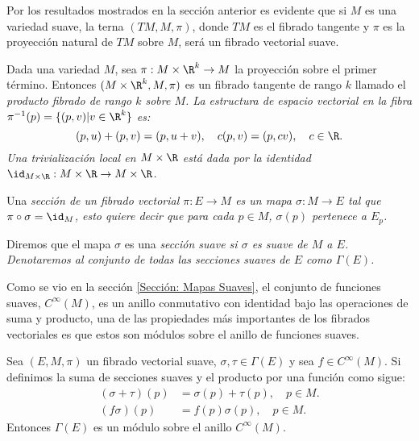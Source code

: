 \begin{example}
	Por los resultados mostrados en la sección anterior es evidente que si $M$ es una variedad suave, la terna $(TM, M, \pi)$, donde $TM$ es el fibrado tangente y $\pi$ es la proyección natural de $TM$ sobre $M$, será un fibrado vectorial suave.
\end{example}

\begin{example}
	Dada una variedad $M$, sea $\pi: M \times \R^{k} \to M$ la proyección sobre el primer término. Entonces $(M \times \R^{k}, M, \pi)$ es un fibrado tangente de rango $k$ llamado el \it{producto fibrado} de rango $k$ sobre $M$. La estructura de espacio vectorial en la fibra $\pi^{-1}(p) = \{(p,v) | v \in \R^{k}\}$ es:
	\[
		(p,u) + (p,v) = (p, u+v), \quad c(p,v) = (p,cv), \quad c \in \R.
	\]
  Una trivialización local en $M \times \R$ está dada por la identidad $\id_{M \times \R}: M \times \R \to  M \times \R$.
\end{example}

\begin{definition}
	Una \it{sección} de un fibrado vectorial $\pi: E \to M$ es un mapa $\sigma: M \to E$ tal que $\pi \circ \sigma = \id_{M}$, esto quiere decir que para cada $p \in M$, $\sigma(p)$ pertenece a $E_p$.

	Diremos que el mapa $\sigma$ es una \it{sección suave} si $\sigma$ es suave de $M$ a $E$. Denotaremos al conjunto de todas las secciones suaves de $E$ como $\Gamma(E)$.
\end{definition}

Como se vio en la sección \ref{Sección: Mapas Suaves}, el conjunto de funciones suaves, $C^{\infty}(M)$, es un anillo conmutativo con identidad bajo las operaciones de suma y producto, una de las propiedades más importantes de los fibrados vectoriales es que estos son módulos sobre el anillo de funciones suaves.

\begin{theorem}\label{Teorema: Los Fibrados Vectoriales Son Modulos}
	Sea $(E,M, \pi)$ un fibrado vectorial suave, $\sigma, \tau \in \Gamma(E)$ y sea $f \in C^{\infty}(M)$. Si definimos la suma de secciones suaves y el producto por una función como sigue:
	\begin{align*}
		(\sigma + \tau)(p) & = \sigma(p) + \tau(p), \quad p \in M. \\
		(f\sigma)(p)       & = f(p)\sigma(p), \quad p \in M.
	\end{align*}
	Entonces $\Gamma(E)$ es un módulo sobre el anillo $C^{\infty}(M)$.
\end{theorem}

